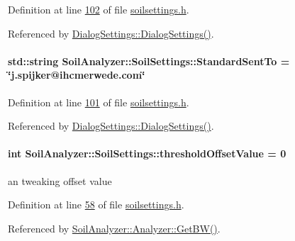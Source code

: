 Definition at line \hyperlink{soilsettings_8h_source_l00102}{102} of file \hyperlink{soilsettings_8h_source}{soilsettings.\+h}.



Referenced by \hyperlink{dialogsettings_8cpp_source_l00005}{Dialog\+Settings\+::\+Dialog\+Settings()}.

\hypertarget{class_soil_analyzer_1_1_soil_settings_ac5010d7e2c8019f090147f8b9d89cb95}{}
\paragraph[{Standard\+Sent\+To}]{\setlength{\rightskip}{0pt plus 5cm}std\+::string Soil\+Analyzer\+::\+Soil\+Settings\+::\+Standard\+Sent\+To = \char`\"{}j.\+spijker@ihcmerwede.\+com\char`\"{}}\label{class_soil_analyzer_1_1_soil_settings_ac5010d7e2c8019f090147f8b9d89cb95}


Definition at line \hyperlink{soilsettings_8h_source_l00101}{101} of file \hyperlink{soilsettings_8h_source}{soilsettings.\+h}.



Referenced by \hyperlink{dialogsettings_8cpp_source_l00005}{Dialog\+Settings\+::\+Dialog\+Settings()}.

\hypertarget{class_soil_analyzer_1_1_soil_settings_a48330eb812672b50a94483f264614e8f}{}
\paragraph[{threshold\+Offset\+Value}]{\setlength{\rightskip}{0pt plus 5cm}int Soil\+Analyzer\+::\+Soil\+Settings\+::threshold\+Offset\+Value = 0}\label{class_soil_analyzer_1_1_soil_settings_a48330eb812672b50a94483f264614e8f}
an tweaking offset value 

Definition at line \hyperlink{soilsettings_8h_source_l00058}{58} of file \hyperlink{soilsettings_8h_source}{soilsettings.\+h}.



Referenced by \hyperlink{analyzer_8cpp_source_l00236}{Soil\+Analyzer\+::\+Analyzer\+::\+Get\+B\+W()}.

